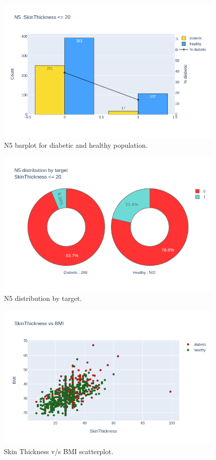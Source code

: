 \documentclass[12pt]{article}
\begin{document}
\begin{figure}[ht]
\centering
\includegraphics[width=1\textwidth]{newplot(23).png}
\caption{\label{fig:33} N5 barplot for diabetic and healthy population.}
\end{figure}

\begin{figure}[ht]
\centering
\includegraphics[width=1\textwidth]{newplot(24).png}
\caption{\label{fig:34} N5 distribution by target.}
\end{figure}

\begin{figure}[ht]
\centering
\includegraphics[width=1\textwidth]{newplot(25).png}
\caption{\label{fig:35} Skin Thickness v/s BMI scatterplot.}
\end{figure}
\end{document}
